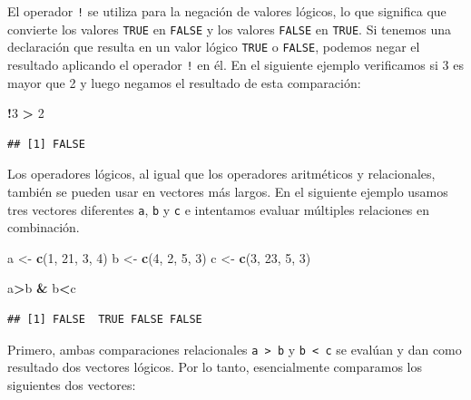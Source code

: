 \documentclass[
]{book}
\newenvironment{Shaded}{\begin{snugshade}}{\end{snugshade}}
\newcommand{\DecValTok}[1]{\textcolor[rgb]{0.00,0.00,0.81}{#1}}
\newcommand{\KeywordTok}[1]{\textcolor[rgb]{0.13,0.29,0.53}{\textbf{#1}}}
\newcommand{\NormalTok}[1]{#1}
\newcommand{\OperatorTok}[1]{\textcolor[rgb]{0.81,0.36,0.00}{\textbf{#1}}}
\newcommand{\StringTok}[1]{\textcolor[rgb]{0.31,0.60,0.02}{#1}}
\begin{document}
El operador \texttt{!} se utiliza para la negación de valores lógicos, lo que significa que convierte los valores \texttt{TRUE} en \texttt{FALSE} y los valores \texttt{FALSE} en \texttt{TRUE}. Si tenemos una declaración que resulta en un valor lógico \texttt{TRUE} o \texttt{FALSE}, podemos negar el resultado aplicando el operador \texttt{!} en él. En el siguiente ejemplo verificamos si 3 es mayor que 2 y luego negamos el resultado de esta comparación:

\begin{Shaded}
\begin{Highlighting}[]
\OperatorTok{!}\DecValTok{3} \OperatorTok{>}\StringTok{ }\DecValTok{2}
\end{Highlighting}
\end{Shaded}

\begin{verbatim}
## [1] FALSE
\end{verbatim}

Los operadores lógicos, al igual que los operadores aritméticos y relacionales, también se pueden usar en vectores más largos. En el siguiente ejemplo usamos tres vectores diferentes \texttt{a}, \texttt{b} y \texttt{c} e intentamos evaluar múltiples relaciones en combinación.

\begin{Shaded}
\begin{Highlighting}[]
\NormalTok{a <-}\StringTok{ }\KeywordTok{c}\NormalTok{(}\DecValTok{1}\NormalTok{, }\DecValTok{21}\NormalTok{, }\DecValTok{3}\NormalTok{, }\DecValTok{4}\NormalTok{)}
\NormalTok{b <-}\StringTok{ }\KeywordTok{c}\NormalTok{(}\DecValTok{4}\NormalTok{, }\DecValTok{2}\NormalTok{, }\DecValTok{5}\NormalTok{, }\DecValTok{3}\NormalTok{)}
\NormalTok{c <-}\StringTok{ }\KeywordTok{c}\NormalTok{(}\DecValTok{3}\NormalTok{, }\DecValTok{23}\NormalTok{, }\DecValTok{5}\NormalTok{, }\DecValTok{3}\NormalTok{)}

\NormalTok{a}\OperatorTok{>}\NormalTok{b }\OperatorTok{&}\StringTok{ }\NormalTok{b}\OperatorTok{<}\NormalTok{c}
\end{Highlighting}
\end{Shaded}

\begin{verbatim}
## [1] FALSE  TRUE FALSE FALSE
\end{verbatim}

Primero, ambas comparaciones relacionales \texttt{a\ \textgreater{}\ b} y \texttt{b\ \textless{}\ c} se evalúan y dan como resultado dos vectores lógicos. Por lo tanto, esencialmente comparamos los siguientes dos vectores:
\end{document}
